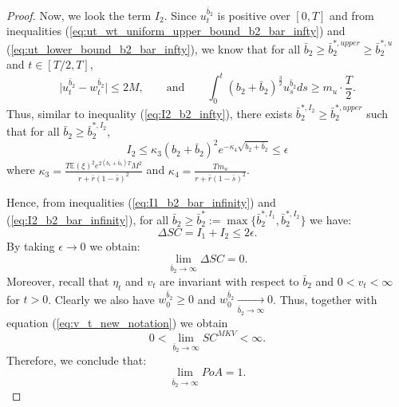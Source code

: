 \documentclass[11pt]{article}
\begin{document}
\begin{proof}
	
	Now, we look the term $I_2$. Since $u_t^{\bar{b}_2}$ is positive over $[0,T]$ and from inequalities (\ref{eq:ut_wt_uniform_upper_bound_b2_bar_infty}) and (\ref{eq:ut_lower_bound_b2_bar_infty}), we know that for all $\bar{b}_2 \geq \bar{b}_2^{*,upper} \geq \bar{b}_2^{*,u}$ and $t \in [T/2,T]$,
	\begin{equation*}
	\vert u_t^{\bar{b}_2} - w_t^{\bar{b}_2} \vert \leq 2M,\qquad \text{and} \qquad \int_0^t (b_2 + \bar{b}_2)^{\frac{3}{2}} u_s^{\bar{b}_2} ds \geq m_u \cdot \frac{T}{2}.
	\end{equation*}
	Thus, similar to inequality (\ref{eq:I2_b2_infty}), there exists $\bar{b}_2^{*,I_2} \geq \bar{b}_2^{*,upper}$ such that for all $\bar{b}_2 \geq \bar{b}_2^{*,I_2}$, 
	\begin{equation}
	I_2  \leq  \kappa_3 (b_2 + \bar{b}_2)^2 e^{ - \kappa_4 \sqrt{b_2 + \bar{b}_2} } \leq \epsilon
	\label{eq:I2_b2_bar_infinity}
	\end{equation}
	where  $\kappa_3 =\frac{T \mathbb{E}(\xi)^2 e^{2 (b_1 + \bar{b}_1) T} M^2 }{r + \bar{r}(1-\bar{s})^2}$ and $\kappa_4 = \frac{T m_u}{r + \bar{r}(1-\bar{s})^2}$.

	Hence, from inequalities (\ref{eq:I1_b2_bar_infinity}) and (\ref{eq:I2_b2_bar_infinity}), for all $\bar{b}_2 \geq \bar{b}_2^* := \max \{ \bar{b}_2^{*,I_1}, \bar{b}_2^{*,I_2}\}$ we have:
	\begin{equation*}
		\Delta SC = I_1 + I_2 \leq 2\epsilon.
	\end{equation*} 
	By taking $\epsilon \to 0$ we obtain:
	\begin{equation*}
		\lim_{\bar{b}_2 \to \infty} \Delta SC = 0.
	\end{equation*}
	Moreover, recall that $\eta_t$ and $v_t$ are invariant with respect to $\bar{b}_2$ and $0<v_t<\infty$ for $t>0$. Clearly we also have $w^{\bar{b}_2}_0 \geq 0$ and $w^{\bar{b}_2}_0 \xrightarrow[\bar{b}_2 \to \infty]{} 0$. Thus, together with equation (\ref{eq:v_t_new_notation}) we obtain
	$$0< \lim_{\bar{b}_2 \to \infty} SC^{MKV} <\infty.$$
	Therefore, we conclude that:
	$$ \lim_{\bar{b}_2 \to \infty} PoA = 1.$$
\end{proof}
\end{document}
